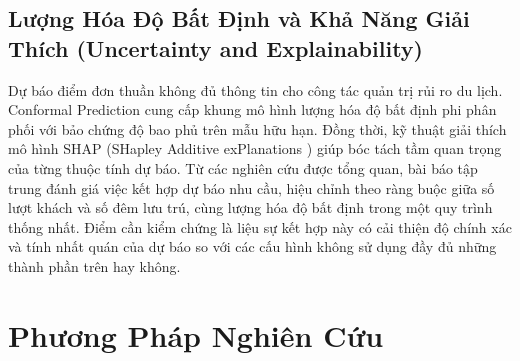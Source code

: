 \documentclass[10pt,journal,compsoc]{IEEEtran}
\begin{document}
\subsection{Lượng Hóa Độ Bất Định và Khả Năng Giải Thích (Uncertainty and Explainability)}
Dự báo điểm đơn thuần không đủ thông tin cho công tác quản trị rủi ro du lịch. Conformal Prediction \cite{vovk2005algorithmic, angelopoulos2021conformal} cung cấp khung mô hình lượng hóa độ bất định phi phân phối với bảo chứng độ bao phủ trên mẫu hữu hạn. Đồng thời, kỹ thuật giải thích mô hình SHAP (SHapley Additive exPlanations \cite{lundberg2017shap}) giúp bóc tách tầm quan trọng của từng thuộc tính dự báo. Từ các nghiên cứu được tổng quan, bài báo tập trung đánh giá việc kết hợp dự báo nhu cầu, hiệu chỉnh theo ràng buộc giữa số lượt khách và số đêm lưu trú, cùng lượng hóa độ bất định trong một quy trình thống nhất. Điểm cần kiểm chứng là liệu sự kết hợp này có cải thiện độ chính xác và tính nhất quán của dự báo so với các cấu hình không sử dụng đầy đủ những thành phần trên hay không.
\section{Phương Pháp Nghiên Cứu}
\end{document}
